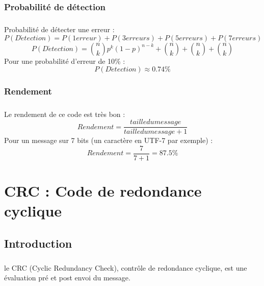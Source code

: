             \subsection{Probabilité de détection}

                \paragraph{}
                    Probabilité de détecter une erreur :
                    \[  P(D\acute{e}tection) = P(1 erreur) + P(3 erreurs) + P(5 erreurs) + P(7 erreurs) \]
                    \[  P(D\acute{e}tection) = {n\choose k}p^k(1-p)^{n-k} + {n\choose k} + {n\choose k} + {n\choose k} \]
                    Pour une probabilité d'erreur de 10\% :
                    \[  P(D\acute{e}tection) \approx 0.74\% \]

            \subsection{Rendement}

                \paragraph{}
                    Le rendement de ce code est très bon :
                    \[  Rendement = \frac{taille du message}{taille du message+1} \]
                    Pour un message sur 7 bits (un caractère en UTF-7 par exemple) :
                    \[  Rendement = \frac{7}{7+1} = 87.5\% \]



    \chapter{CRC : Code de redondance cyclique}

        \section{Introduction}

            \paragraph{}
                le CRC (Cyclic Redundancy Check), contrôle de redondance cyclique,
                est une évaluation pré et post envoi du message.

        \newpage

